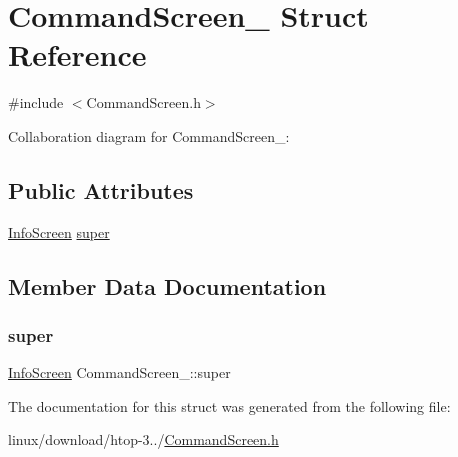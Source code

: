 \hypertarget{structCommandScreen__}{}\section{Command\+Screen\+\_\+ Struct Reference}
\label{structCommandScreen__}


{\ttfamily \#include $<$Command\+Screen.\+h$>$}



Collaboration diagram for Command\+Screen\+\_\+\+:
\subsection*{Public Attributes}
\begin{DoxyCompactItemize}
\item 
\hyperlink{InfoScreen_8h_a97139d799c65bdbb53b127e2717369c8}{Info\+Screen} \hyperlink{structCommandScreen___a2933ba792dfbfa6b4a042664af9191b7}{super}
\end{DoxyCompactItemize}


\subsection{Member Data Documentation}
\mbox{\label{structCommandScreen___a2933ba792dfbfa6b4a042664af9191b7}} 
\subsubsection{\texorpdfstring{super}{super}}
{\footnotesize\ttfamily \hyperlink{InfoScreen_8h_a97139d799c65bdbb53b127e2717369c8}{Info\+Screen} Command\+Screen\+\_\+\+::super}



The documentation for this struct was generated from the following file\+:\begin{DoxyCompactItemize}
\item 
linux/download/htop-\/3../\hyperlink{CommandScreen_8h}{Command\+Screen.\+h}\end{DoxyCompactItemize}
